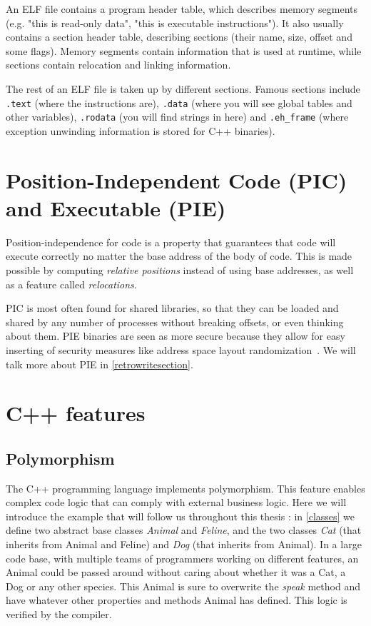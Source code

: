 \documentclass[a4paper,11pt,oneside]{report}
\begin{document}
An ELF file contains a program header table, which describes memory segments 
(e.g. "this is read-only data", "this is executable instructions").
It also usually contains a section header table, describing sections (their 
name, size, offset and some flags).
Memory segments contain information that is used at runtime, while sections
contain relocation and linking information.

The rest of an ELF file is taken up by different sections.
Famous sections include
\texttt{.text} (where the instructions are),
\texttt{.data} (where you will see global tables and other variables),
\texttt{.rodata} (you will find strings in here)
and \texttt{.eh\_frame} (where exception unwinding information is stored for 
C++ binaries).


\section{Position-Independent Code (PIC) and Executable (PIE)}
\label{picpie}

Position-independence for code is a property that guarantees that code will 
execute correctly no matter the base address of the body of code.
This is made possible by computing \emph{relative positions} instead of
using base addresses, as well as a feature called \emph{relocations}.

PIC is most often found for shared libraries, so that they can be loaded and
shared by any number of processes without breaking offsets, or even thinking
about them.
PIE binaries are seen as more secure because they allow for easy inserting of 
security measures like address space layout 
randomization~\cite{aslr}.
We will talk more about PIE in \autoref{retrowritesection}.


\section{C++ features}

\subsection{Polymorphism}
\label{polymorphism}

The C++ programming language implements polymorphism.
This feature enables complex code logic that can comply with external business 
logic.
Here we will introduce the example that will follow us throughout this thesis :
in \autoref{classes} we define two abstract base classes \emph{Animal} and 
\emph{Feline},
and the two classes \emph{Cat} (that inherits from Animal and Feline) and 
\emph{Dog} (that inherits from Animal).
In a large code base, with multiple teams of programmers working on different 
features,
an Animal could be passed around without caring about whether it was a Cat, a 
Dog or any other species.
This Animal is sure to overwrite the \emph{speak} method and have whatever 
other properties and methods Animal has defined.
This logic is verified by the compiler.
\end{document}
